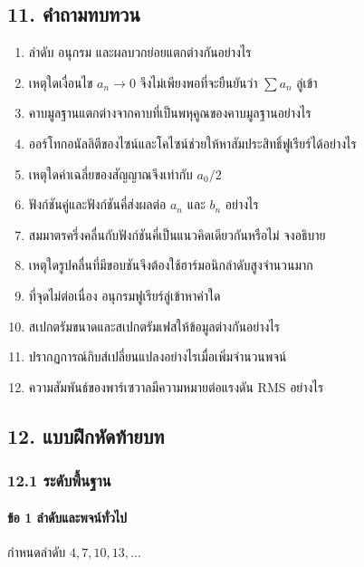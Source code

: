\subsection{11. คำถามทบทวน}

\begin{enumerate}
\def\labelenumi{\arabic{enumi}.}
\item
  ลำดับ อนุกรม และผลบวกย่อยแตกต่างกันอย่างไร
\item
  เหตุใดเงื่อนไข \(a_n\to0\) จึงไม่เพียงพอที่จะยืนยันว่า \(\sum a_n\) ลู่เข้า
\item
  คาบมูลฐานแตกต่างจากคาบที่เป็นพหุคูณของคาบมูลฐานอย่างไร
\item
  ออร์โทกอนัลลิตีของไซน์และโคไซน์ช่วยให้หาสัมประสิทธิ์ฟูเรียร์ได้อย่างไร
\item
  เหตุใดค่าเฉลี่ยของสัญญาณจึงเท่ากับ \(a_0/2\)
\item
  ฟังก์ชันคู่และฟังก์ชันคี่ส่งผลต่อ \(a_n\) และ \(b_n\) อย่างไร
\item
  สมมาตรครึ่งคลื่นกับฟังก์ชันคี่เป็นแนวคิดเดียวกันหรือไม่ จงอธิบาย
\item
  เหตุใดรูปคลื่นที่มีขอบชันจึงต้องใช้ฮาร์มอนิกลำดับสูงจำนวนมาก
\item
  ที่จุดไม่ต่อเนื่อง อนุกรมฟูเรียร์ลู่เข้าหาค่าใด
\item
  สเปกตรัมขนาดและสเปกตรัมเฟสให้ข้อมูลต่างกันอย่างไร
\item
  ปรากฏการณ์กิบส์เปลี่ยนแปลงอย่างไรเมื่อเพิ่มจำนวนพจน์
\item
  ความสัมพันธ์ของพาร์เซวาลมีความหมายต่อแรงดัน RMS อย่างไร
\end{enumerate}

\newpage

\subsection{12. แบบฝึกหัดท้ายบท}

\subsubsection{12.1 ระดับพื้นฐาน}

\paragraph{ข้อ 1 ลำดับและพจน์ทั่วไป}

กำหนดลำดับ \(4,7,10,13,\ldots\)

